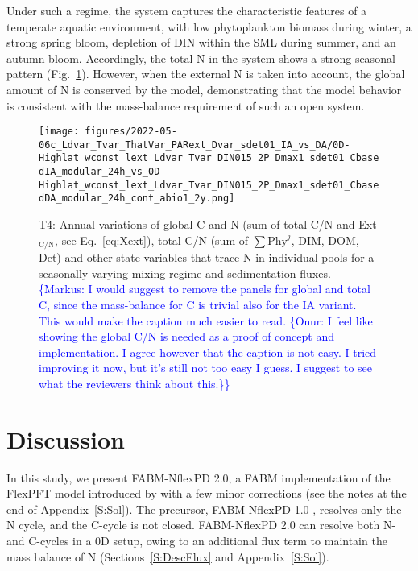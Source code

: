 \documentclass[gmd, manuscript]{copernicus}
\newcommand{\onur}[1]{\textcolor{blue}{\{Onur: #1\}}}
\newcommand{\markus}[1]{\textcolor{blue}{\{Markus: #1\}}}
\begin{document}
Under such a regime, the system captures the characteristic features of a temperate aquatic environment, with low phytoplankton biomass during winter, a strong spring bloom, depletion of DIN within the SML during summer, and an autumn bloom. Accordingly, the total N in the system shows a strong seasonal pattern (Fig.~\ref{f.T4res}). However, when the external N is taken into account, the global amount of N is conserved by the model, demonstrating that the model behavior is consistent with the mass-balance requirement of such an open system.

\begin{figure}[ht!]
\texttt{[image: figures/2022-05-06c\_Ldvar\_Tvar\_ThatVar\_PARext\_Dvar\_sdet01\_IA\_vs\_DA/0D-Highlat\_wconst\_lext\_Ldvar\_Tvar\_DIN015\_2P\_Dmax1\_sdet01\_CbasedIA\_modular\_24h\_vs\_0D-Highlat\_wconst\_lext\_Ldvar\_Tvar\_DIN015\_2P\_Dmax1\_sdet01\_CbasedDA\_modular\_24h\_cont\_abio1\_2y.png]}
\caption{T4: Annual variations of global C and N (sum of total C/N and Ext$_{\text{C/N}}$, see Eq.~\ref{eq:Xext}), total C/N (sum of $\sum\text{Phy}^j$, DIM, DOM, Det) and other state variables that trace N in individual pools for a seasonally varying mixing regime and sedimentation fluxes. \markus{I would suggest to remove the panels for global and total C, since the mass-balance for C is trivial also for the IA variant.  This would make the caption much easier to read. \onur{I feel like showing the global C/N is needed as a proof of concept and implementation. I agree however that the caption is not easy. I tried improving it now, but it's still not too easy I guess. I suggest to see what the reviewers think about this.}}}\label{f.T4res}
\end{figure}


%

\FloatBarrier%
\section{Discussion}

In this study, we present FABM-NflexPD 2.0, a FABM implementation of the FlexPFT model introduced by \citet{Smith2016} with a few minor corrections (see the notes at the end of Appendix~\ref{S:Sol}). The precursor, FABM-NflexPD 1.0 \citep{Kerimoglu2021}, resolves only the N cycle, and the C-cycle is not closed.  FABM-NflexPD 2.0 can resolve both N- and C-cycles in a 0D setup, owing to an additional flux term to maintain the mass balance of N (Sections~\ref{S:DescFlux} and Appendix~\ref{S:Sol}).
\end{document}
